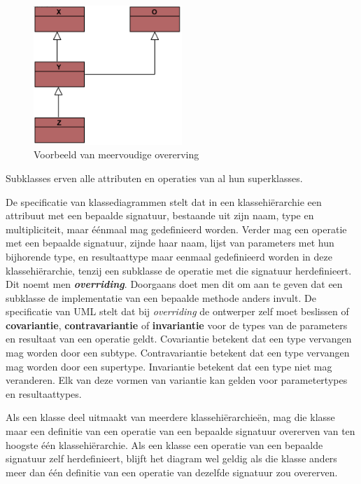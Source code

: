 \begin{figure}
	\centering
	\includegraphics[width=0.5\textwidth]{chap-consistentie/voorbeeld6.png}
	\caption{Voorbeeld van meervoudige overerving}
	\label{fig:multi-inheritance}
\end{figure}

Subklasses erven alle attributen en operaties van al hun superklasses.

De specificatie van klassediagrammen stelt dat in een klassehi\"erarchie een attribuut met een bepaalde signatuur, bestaande uit zijn naam, type en multipliciteit, maar \'e\'enmaal mag gedefinieerd worden. Verder mag een operatie met een bepaalde signatuur, zijnde haar naam, lijst van parameters met hun bijhorende type, en resultaattype maar eenmaal gedefinieerd worden in deze klassehi\"erarchie, tenzij een subklasse de operatie met die signatuur herdefinieert. Dit noemt men \textit{\textbf{overriding}}. Doorgaans doet men dit om aan te geven dat een subklasse de implementatie van een bepaalde methode anders invult. De specificatie van UML\cite{OMG-UML} stelt dat bij \textit{overriding} de ontwerper zelf moet beslissen of \textbf{covariantie}, \textbf{contravariantie} of \textbf{invariantie} voor de types van de parameters en resultaat van een operatie geldt. Covariantie betekent dat een type vervangen mag worden door een subtype. Contravariantie betekent dat een type vervangen mag worden door een supertype. Invariantie betekent dat een type niet mag veranderen. Elk van deze vormen van variantie kan gelden voor parametertypes en resultaattypes.

Als een klasse deel uitmaakt van meerdere klassehi\"erarchie\"en, mag die klasse maar een definitie van een operatie van een bepaalde signatuur overerven van ten hoogste \'e\'en klassehi\"erarchie. Als een klasse een operatie van een bepaalde signatuur zelf herdefinieert, blijft het diagram wel geldig als die klasse anders meer dan \'e\'en definitie van een operatie van dezelfde signatuur zou overerven.

